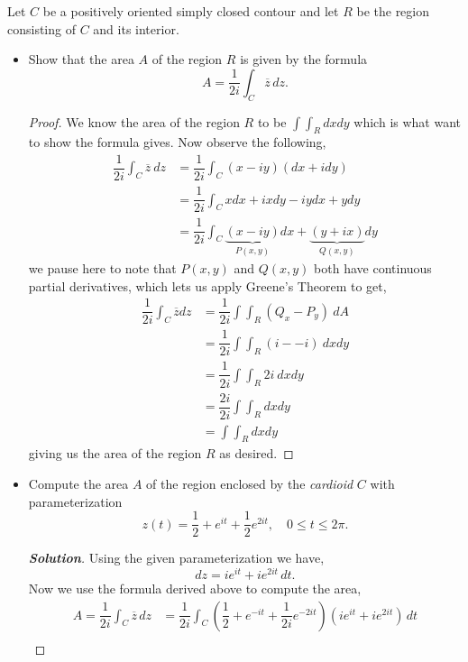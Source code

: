 \documentclass[11pt]{article}
\newenvironment{problem}[2][Problem\!]{\begin{trivlist}
\item[\hskip \labelsep {\bfseries #1}\hskip \labelsep {\bfseries #2}]}{\end{trivlist}}
\newenvironment{solution}{\begin{proof}[\textbf{\textit{Solution}}] }{\end{proof}}
\renewcommand{\leq}{\leqslant}
\newcommand{\lrp}[1]{\left(#1\right)}
\begin{document}
\newpage  %

\begin{problem}{7.2}
Let $C$ be a positively oriented simply closed contour and let $R$ be the region consisting of $C$ and its interior.
\begin{itemize}[itemsep=3em]
\item[(a)] Show that the area $A$ of the region $R$ is given by the formula \[A = \frac{1}{2i} \int_C \overline{z} \, dz.\]
\begin{proof}
  We know the area of the region $R$ to be $\int\int_R dx dy $ which is what want to show the formula gives. Now observe the following,
  \begin{align*}
    \dfrac{1}{2i}\int_C \overline{z}\ d z &= \dfrac{1}{2i}\int_C (x - i y)(dx + i d y )  \\
    &= \dfrac{1}{2i}\int_C x dx + i x d y - i y dx + y d y \\
    &= \dfrac{1}{2i}\int_C \underbrace{(x - i y)}_{P(x,y)}d x + \underbrace{(y + i x )}_{Q(x,y)}d y  
  \end{align*}
  we pause here to note that $P(x,y)$ and $Q(x,y)$ both have continuous partial derivatives, which lets us apply Greene's Theorem to get,
  \begin{align*}
    \dfrac{1}{2i}\int_C \overline{z}d z &= \dfrac{1}{2i}\int\int_R(Q_x - P_y)\ dA \\
    &= \dfrac{1}{2i}\int\int_R(i - -i)\ dx d y \\
    &= \dfrac{1}{2i}\int\int_R 2i\ dx d y \\
    &= \dfrac{2i}{2i} \int\int_R dx d y  \\
    &= \int\int_R dx d y
  \end{align*}
  giving us the area of the region $R$ as desired. 
\end{proof}
\newpage
\item[(b)] Compute the area $A$ of the region enclosed by the \emph{cardioid} $C$ with parameterization
\[z(t) = \frac{1}{2} + e^{it} + \frac{1}{2}e^{2it},\quad 0 \leq t \leq 2\pi.\] 
\begin{solution}
  Using the given parameterization we have,
  \[dz = ie^{it} + ie^{2it}\, dt.\]
  Now we use the formula derived above to compute the area,
  \begin{align*}
    A = \dfrac{1}{2i}\int_C \overline{z}\, d z &= \dfrac{1}{2i}\int_C  \lrp{\dfrac{1}{2} + e^{-it} + \dfrac{1}{2i}e^{-2it}}\lrp{ie^{it} + ie^{2i t}}\, d t \\

\end{align*}
\end{solution}
\end{itemize}
\end{problem}
\end{document}
